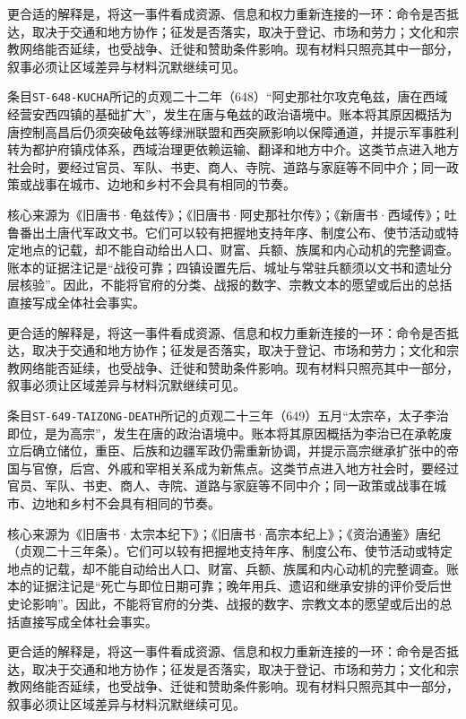 更合适的解释是，将这一事件看成资源、信息和权力重新连接的一环：命令是否抵达，取决于交通和地方协作；征发是否落实，取决于登记、市场和劳力；文化和宗教网络能否延续，也受战争、迁徙和赞助条件影响。现有材料只照亮其中一部分，叙事必须让区域差异与材料沉默继续可见。

条目\texttt{ST-648-KUCHA}所记的贞观二十二年（648）“阿史那社尔攻克龟兹，唐在西域经营安西四镇的基础扩大”，发生在唐与龟兹的政治语境中。账本将其原因概括为唐控制高昌后仍须突破龟兹等绿洲联盟和西突厥影响以保障通道，并提示军事胜利转为都护府镇戍体系，西域治理更依赖运输、翻译和地方中介。这类节点进入地方社会时，要经过官员、军队、书吏、商人、寺院、道路与家庭等不同中介；同一政策或战事在城市、边地和乡村不会具有相同的节奏。

核心来源为《旧唐书·龟兹传》；《旧唐书·阿史那社尔传》；《新唐书·西域传》；吐鲁番出土唐代军政文书。它们可以较有把握地支持年序、制度公布、使节活动或特定地点的记载，却不能自动给出人口、财富、兵额、族属和内心动机的完整调查。账本的证据注记是“战役可靠；四镇设置先后、城址与常驻兵额须以文书和遗址分层核验”。因此，不能将官府的分类、战报的数字、宗教文本的愿望或后出的总括直接写成全体社会事实。

更合适的解释是，将这一事件看成资源、信息和权力重新连接的一环：命令是否抵达，取决于交通和地方协作；征发是否落实，取决于登记、市场和劳力；文化和宗教网络能否延续，也受战争、迁徙和赞助条件影响。现有材料只照亮其中一部分，叙事必须让区域差异与材料沉默继续可见。

条目\texttt{ST-649-TAIZONG-DEATH}所记的贞观二十三年（649）五月“太宗卒，太子李治即位，是为高宗”，发生在唐的政治语境中。账本将其原因概括为李治已在承乾废立后确立储位，重臣、后族和边疆军政仍需重新协调，并提示高宗继承扩张中的帝国与官僚，后宫、外戚和宰相关系成为新焦点。这类节点进入地方社会时，要经过官员、军队、书吏、商人、寺院、道路与家庭等不同中介；同一政策或战事在城市、边地和乡村不会具有相同的节奏。

核心来源为《旧唐书·太宗本纪下》；《旧唐书·高宗本纪上》；《资治通鉴》唐纪（贞观二十三年条）。它们可以较有把握地支持年序、制度公布、使节活动或特定地点的记载，却不能自动给出人口、财富、兵额、族属和内心动机的完整调查。账本的证据注记是“死亡与即位日期可靠；晚年用兵、遗诏和继承安排的评价受后世史论影响”。因此，不能将官府的分类、战报的数字、宗教文本的愿望或后出的总括直接写成全体社会事实。

更合适的解释是，将这一事件看成资源、信息和权力重新连接的一环：命令是否抵达，取决于交通和地方协作；征发是否落实，取决于登记、市场和劳力；文化和宗教网络能否延续，也受战争、迁徙和赞助条件影响。现有材料只照亮其中一部分，叙事必须让区域差异与材料沉默继续可见。

